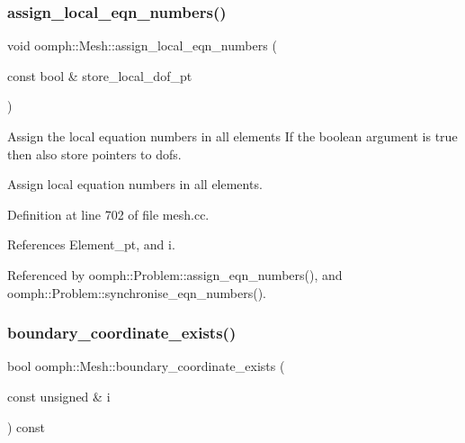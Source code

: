 \mbox{\label{classoomph_1_1Mesh_ab73d03d38e9b94b15f21b2c12f5dc3bc}} 
\subsubsection{\texorpdfstring{assign\+\_\+local\+\_\+eqn\+\_\+numbers()}{assign\_local\_eqn\_numbers()}}
{\footnotesize\ttfamily void oomph\+::\+Mesh\+::assign\+\_\+local\+\_\+eqn\+\_\+numbers (\begin{DoxyParamCaption}\item[{const bool \&}]{store\+\_\+local\+\_\+dof\+\_\+pt }\end{DoxyParamCaption})\hspace{0.3cm}{\ttfamily [protected]}}



Assign the local equation numbers in all elements If the boolean argument is true then also store pointers to dofs. 

Assign local equation numbers in all elements. 

Definition at line 702 of file mesh.\+cc.



References Element\+\_\+pt, and i.



Referenced by oomph\+::\+Problem\+::assign\+\_\+eqn\+\_\+numbers(), and oomph\+::\+Problem\+::synchronise\+\_\+eqn\+\_\+numbers().

\mbox{\label{classoomph_1_1Mesh_ad1b124a959628aba00162b89617b3a62}} 
\subsubsection{\texorpdfstring{boundary\+\_\+coordinate\+\_\+exists()}{boundary\_coordinate\_exists()}}
{\footnotesize\ttfamily bool oomph\+::\+Mesh\+::boundary\+\_\+coordinate\+\_\+exists (\begin{DoxyParamCaption}\item[{const unsigned \&}]{i }\end{DoxyParamCaption}) const\hspace{0.3cm}{\ttfamily [inline]}}



